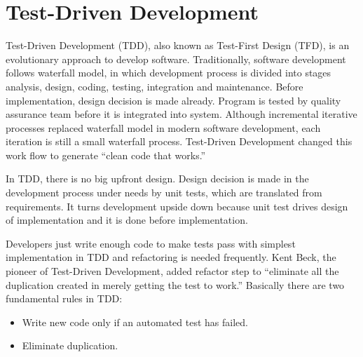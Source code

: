 \section{Test-Driven Development}
Test-Driven Development (TDD), also known as Test-First Design (TFD), is an
evolutionary approach to develop software. Traditionally, software
development follows waterfall model, in which development process is
divided into stages analysis, design, coding, testing, integration and
maintenance. Before implementation, design decision is made already. 
Program is tested by quality assurance team before it is integrated into 
system. Although incremental iterative processes replaced waterfall model 
in modern software development, each iteration is still a small 
waterfall process. Test-Driven Development changed this work flow to generate
``clean code that works.''\cite{Beck:03}

In TDD, there is no big upfront design. Design decision is made in the
development process under needs by unit tests, which are translated from
requirements. It turns development upside down \cite{Pipka:03} because unit
test drives design of implementation and it is done before implementation.

Developers just write enough code to make tests pass with simplest
implementation in TDD and refactoring is needed frequently. Kent Beck, the
pioneer of Test-Driven Development, added refactor step to ``eliminate all
the duplication created in merely getting the test to work.'' Basically
there are two fundamental rules in TDD\cite{Beck:03}:

{\it
\begin{itemize}
\item Write new code only if an automated test has failed.
\item Eliminate duplication. 
\end{itemize}
}

